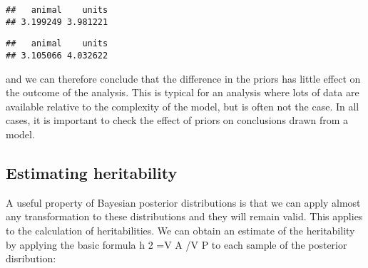 \documentclass[12pt,]{book}
\newenvironment{Shaded}{\begin{snugshade}}{\end{snugshade}}
\newcommand{\FloatTok}[1]{\textcolor[rgb]{0.00,0.00,0.81}{#1}}
\newcommand{\KeywordTok}[1]{\textcolor[rgb]{0.13,0.29,0.53}{\textbf{#1}}}
\newcommand{\NormalTok}[1]{#1}
\newcommand{\OperatorTok}[1]{\textcolor[rgb]{0.81,0.36,0.00}{\textbf{#1}}}
\newcommand{\StringTok}[1]{\textcolor[rgb]{0.31,0.60,0.02}{#1}}
\begin{document}
\begin{verbatim}
##   animal    units 
## 3.199249 3.981221
\end{verbatim}

\begin{Shaded}
\end{Shaded}

\begin{verbatim}
##   animal    units 
## 3.105066 4.032622
\end{verbatim}

and we can therefore conclude that the difference in the priors has little effect on the outcome of the analysis. This is typical for an analysis where lots of data are available relative to the complexity of the model, but is often not the case. In all cases, it is important to check the effect of priors on conclusions drawn from a model.

\hypertarget{estimating-heritability-1}{%
\subsection{Estimating heritability}\label{estimating-heritability-1}}

A useful property of Bayesian posterior distributions is that we can apply almost any transformation to these distributions and they will remain valid. This applies to the calculation of heritabilities. We can obtain an estimate of the heritability by applying the basic formula h 2 =V A /V P to each sample of the posterior disribution:

\begin{Shaded}
\end{Shaded}
\end{document}
